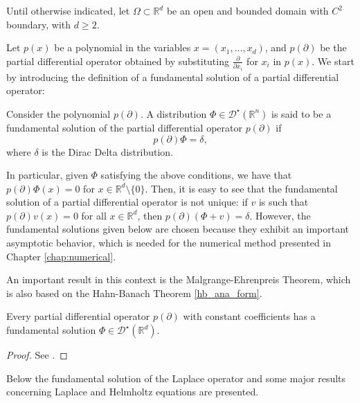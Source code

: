 \label{chap:problem_introduction}

Until otherwise indicated, let \(\Omega \subset \mathbb{R}^d\) be an open and bounded domain with \(C^2\) boundary, with $d \geq 2$.

Let \(p(x)\) be a polynomial in the variables \(x=(x_1,\dots,x_d)\), and \(p(\partial)\) be the partial differential operator obtained by substituting \(\frac{\partial}{\partial x_i}\) for \(x_i\) in \(p(x)\). We start by introducing the definition of a fundamental solution of a partial differential operator:

\begin{definition}
    Consider the polynomial \(p(\partial)\). A distribution \(\Phi \in \mathcal{D}^\star(\mathbb{R}^n)\) is said to be a fundamental solution of the partial differential operator \(p(\partial)\) if
    \[
        p(\partial) \Phi = \delta,
    \]
    where \(\delta\) is the Dirac Delta distribution.
\end{definition}

In particular, given \(\Phi\) satisfying the above conditions, we have that \(p(\partial)\Phi(x) = 0\) for \(x \in \mathbb{R}^d\setminus \{0\}\). Then, it is easy to see that the fundamental solution of a partial differential operator is not unique: if \(v\) is such that \(p(\partial) v(x) = 0\) for all \(x \in \mathbb{R}^d\), then \(p(\partial) (\Phi + v) = \delta\). However, the fundamental solutions given below are chosen because they exhibit an important asymptotic behavior, which is needed for the numerical method presented in Chapter \ref{chap:numerical}.

An important result in this context is the Malgrange-Ehrenpreis Theorem, which is also based on the Hahn-Banach Theorem \ref{hb_ana_form}.

\begin{theorem}\label{malgrange-ehrenpreis}
    Every partial differential operator $p(\partial)$ with constant coefficients has a fundamental solution $\Phi \in \mathcal{D}^\star(\mathbb{R}^d)$.
\end{theorem}
\begin{proof}
    See \cite{reed1975ii}.
\end{proof}
Below the fundamental solution of the Laplace operator and some major results concerning Laplace and Helmholtz equations are presented.

